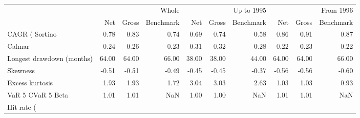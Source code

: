 \begin{tabular}{lrrrrrrrrr}
\toprule
 & \multicolumn{3}{r}{Whole} & \multicolumn{3}{r}{Up to 1995} & \multicolumn{3}{r}{From 1996} \\
 & Net & Gross & Benchmark & Net & Gross & Benchmark & Net & Gross & Benchmark \\
\midrule
CAGR (%
Sortino & 0.78 & 0.83 & 0.74 & 0.69 & 0.74 & 0.58 & 0.86 & 0.91 & 0.87 \\
Calmar & 0.24 & 0.26 & 0.23 & 0.31 & 0.32 & 0.28 & 0.22 & 0.23 & 0.22 \\
Longest drawdown (months) & 64.00 & 64.00 & 66.00 & 38.00 & 38.00 & 44.00 & 64.00 & 64.00 & 66.00 \\
Skewness & -0.51 & -0.51 & -0.49 & -0.45 & -0.45 & -0.37 & -0.56 & -0.56 & -0.60 \\
Excess kurtosis & 1.93 & 1.93 & 1.72 & 3.04 & 3.03 & 2.63 & 1.03 & 1.03 & 0.93 \\
VaR 5%
CVaR 5%
Beta & 1.01 & 1.01 & NaN & 1.00 & 1.00 & NaN & 1.01 & 1.01 & NaN \\
Hit rate (%
\bottomrule
\end{tabular}
